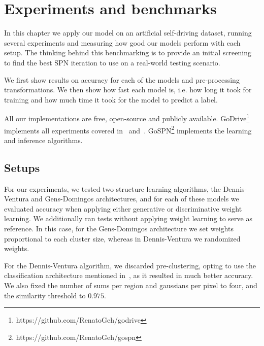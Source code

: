 
\chapter{Experiments and benchmarks}\label{chp:benchmarks}

In this chapter we apply our model on an artificial self-driving dataset, running several
experiments and measuring how good our models perform with each setup. The thinking behind this
benchmarking is to provide an initial screening to find the best SPN iteration to use on a
real-world testing scenario.

We first show results on accuracy for each of the models and pre-processing transformations.
We then show how fast each model is, i.e. how long it took for training and how much time it took
for the model to predict a label.

All our implementations are free, open-source and publicly available.
GoDrive\footnote{https://github.com/RenatoGeh/godrive} implements all experiments covered
in~ and~.
GoSPN\footnote{https://github.com/RenatoGeh/gospn} implements the learning and inference
algorithms.

\section{Setups}

For our experiments, we tested two structure learning algorithms, the Dennis-Ventura and
Gens-Domingos architectures, and for each of these models we evaluated accuracy when applying
either generative or discriminative weight learning. We additionally ran tests without applying
weight learning to serve as reference. In this case, for the Gens-Domingos architecture we set
weights proportional to each cluster size, whereas in Dennis-Ventura we randomized weights.

For the Dennis-Ventura algorithm, we discarded pre-clustering, opting to use the classification
architecture mentioned in~, as it resulted in much better accuracy. We also
fixed the number of sums per region and gaussians per pixel to four, and the similarity threshold
to $0.975$.

